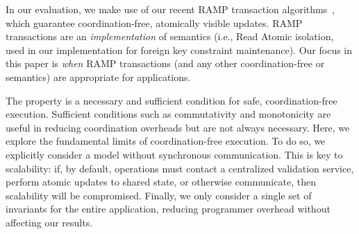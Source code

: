 In our evaluation, we make use of our recent RAMP
transaction algorithms~\cite{ramp-txns}, which guarantee
coordination-free, atomically visible updates. RAMP transactions are
an \textit{implementation} of \iconfluent semantics (i.e., Read Atomic
isolation, used in our implementation for foreign key constraint
maintenance). Our focus in this paper is \textit{when} RAMP
transactions (and any other coordination-free or \iconfluent semantics)
are appropriate for applications.

 The \iconfluence property is a necessary and
sufficient condition for safe, coordination-free execution. Sufficient
conditions such as commutativity and monotonicity are useful in
reducing coordination overheads but are not always necessary. Here, we
explore the fundamental limits of coordination-free execution. To do
so, we explicitly consider a model without synchronous
communication. This is key to scalability: if, by default, operations
must contact a centralized validation service, perform atomic updates
to shared state, or otherwise communicate, then scalability will be
compromised. Finally, we only consider a single set of invariants for
the entire application, reducing programmer overhead without affecting
our \iconfluence results.

